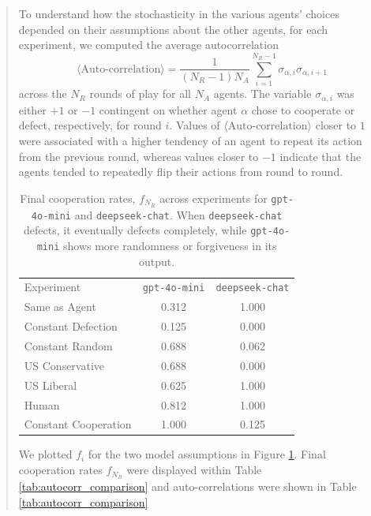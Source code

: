 \documentclass[%
 reprint,
 amsmath,amssymb,
 aps,
]{revtex4-2}
\begin{document}
\begin{abstract}
To understand how the stochasticity in the various agents' choices depended on their assumptions about the other agents, for each experiment, we computed the average autocorrelation
\begin{equation}
    \langle \text{Auto-correlation}\rangle = \frac{1}{(N_R-1)N_A}\sum_{i=1}^{N_R-1}\sigma_{\alpha, i}\sigma_{\alpha, i+1}
\end{equation}
 across the $N_R$ rounds of play for all $N_A$ agents. The variable $\sigma_{\alpha, i}$  was either $+1$ or $-1$ contingent on whether agent $\alpha$ chose to cooperate or defect, respectively, for round $i$. Values of $\langle \text{Auto-correlation}\rangle$ closer to $1$ were associated with a higher tendency of an agent to repeat its action from the previous round, whereas values closer to $-1$ indicate that the agents tended to repeatedly flip their actions from round to round.

\begin{table}[t]
\begin{ruledtabular}
\begin{tabular}{lcc}
\textrm{Experiment} & \texttt{gpt-4o-mini} & \texttt{deepseek-chat} \\
\colrule
Same as Agent        & 0.312 & 1.000 \\
Constant Defection   & 0.125 & 0.000 \\
Constant Random      & 0.688 & 0.062 \\
US Conservative      & 0.688 & 0.000 \\
US Liberal           & 0.625 & 1.000 \\
Human                & 0.812 & 1.000 \\
Constant Cooperation & 1.000 & 0.125 \\
\end{tabular}
\end{ruledtabular}
\caption{\label{tab:coop_results} Final cooperation rates, $f_{N_R}$ across experiments 
for \texttt{gpt-4o-mini} and \texttt{deepseek-chat}. When \texttt{deepseek-chat} defects, it eventually defects completely, while \texttt{gpt-4o-mini} shows more randomness or forgiveness in its output. }
\end{table}

We plotted $f_i$ for the two model assumptions in Figure \ref{tab:coop_results}. Final cooperation rates $f_{N_R}$ were displayed within Table \ref{tab:autocorr_comparison} and auto-correlations were shown in Table \ref{tab:autocorr_comparison}


\end{abstract}
\end{document}

